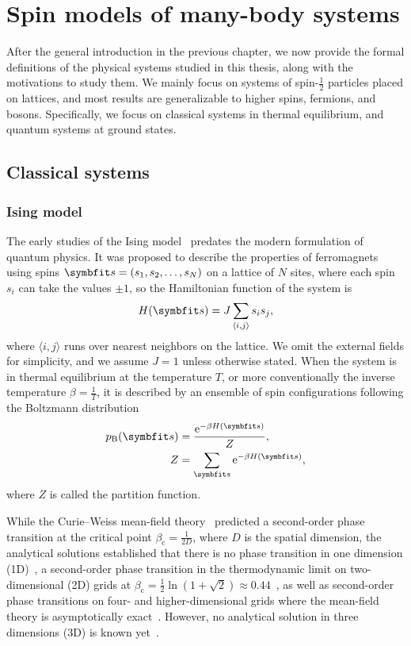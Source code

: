\chapter{Spin models of many-body systems}
\label{ch:systems}

After the general introduction in the previous chapter, we now provide the formal definitions of the physical systems studied in this thesis, along with the motivations to study them. We mainly focus on systems of spin-$\frac{1}{2}$ particles placed on lattices, and most results are generalizable to higher spins, fermions, and bosons. Specifically, we focus on classical systems in thermal equilibrium, and quantum systems at ground states.

\section{Classical systems}
\label{sec:cl-sys}

\subsection{Ising model}
\label{sec:cl-ising}

The early studies of the Ising model~\cite{ising1925contribution, niss2008history} predates the modern formulation of quantum physics. It was proposed to describe the properties of ferromagnets using spins $\vs = (s_1, s_2, \ldots, s_N)$ on a lattice of $N$ sites, where each spin $s_i$ can take the values $\pm 1$, so the Hamiltonian function of the system is
\begin{equation}
H(\vs) = J \sum_{\langle i, j \rangle} s_i s_j,
\label{eq:cl-ising}
\end{equation}
where $\langle i, j \rangle$ runs over nearest neighbors on the lattice. We omit the external fields for simplicity, and we assume $J = 1$ unless otherwise stated. When the system is in thermal equilibrium at the temperature $T$, or more conventionally the inverse temperature $\beta = \frac{1}{T}$, it is described by an ensemble of spin configurations following the Boltzmann distribution
\begin{align}
p_\text{B}(\vs) &= \frac{\rme^{-\beta H(\vs)}}{Z}, \label{eq:boltzmann} \\
Z &= \sum_\vs \rme^{-\beta H(\vs)},
\end{align}
where $Z$ is called the partition function.

While the Curie--Weiss mean-field theory~\cite{weiss1907hypothese} predicted a second-order phase transition at the critical point $\beta_\text{c} = \frac{1}{2 D}$, where $D$ is the spatial dimension, the analytical solutions established that there is no phase transition in one dimension (1D)~\cite{ising1925contribution}, a second-order phase transition in the thermodynamic limit on two-dimensional (2D) grids at $\beta_\text{c} = \frac{1}{2} \ln(1 + \sqrt{2}) \approx 0.44$~\cite{onsager1944crystal}, as well as second-order phase transitions on four- and higher-dimensional grids where the mean-field theory is asymptotically exact~\cite{als1977mean}. However, no analytical solution in three dimensions (3D) is known yet~\cite{viswanathan2022does}.

